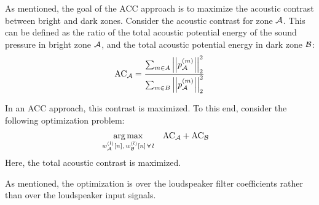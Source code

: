 As mentioned, the goal of the ACC approach is to maximize the acoustic contrast between bright and dark zones.
Consider the acoustic contrast for zone $\mathcal{A}$.
This can be defined as the ratio of the total acoustic potential energy of the sound pressure in bright zone $\mathcal{A}$, and the total acoustic potential energy in 
dark zone $\mathcal{B}$: 
\begin{equation}
    \text{AC}_{\za} = \frac{\sum_{m\in A} \norm[2][2]{p_\za^{(m)}}}{\sum_{m\in B} \norm[2][2]{p_\za^{(m)}}} 
\end{equation}

In an ACC approach, this contrast is maximized. 
To this end, consider the following optimization problem:
\begin{align}
    \argmax{w_\za^{(l)}[n],\,w_\zb^{(l)}[n]\,\forall\,l}{
       &\text{AC}_\za + \text{AC}_\zb
    }
\end{align}
Here, the total acoustic contrast is maximized.

As mentioned, the optimization is over the loudspeaker filter coefficients rather than over the loudspeaker input signals.
